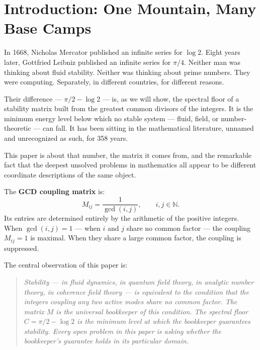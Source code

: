 \documentclass[12pt]{article}
\begin{document}
\newpage
\tableofcontents
\newpage

\section{Introduction: One Mountain, Many Base Camps}

In 1668, Nicholas Mercator published an infinite series for
$\log 2$. Eight years later, Gottfried Leibniz published an
infinite series for $\pi/4$. Neither man was thinking about
fluid stability. Neither was thinking about prime numbers.
They were computing. Separately, in different countries, for
different reasons.

Their difference --- $\pi/2 - \log 2$ --- is, as we will show,
the spectral floor of a stability matrix built from the greatest
common divisors of the integers. It is the minimum energy level
below which no stable system --- fluid, field, or number-theoretic
--- can fall. It has been sitting in the mathematical literature,
unnamed and unrecognized as such, for 358 years.

This paper is about that number, the matrix it comes from, and
the remarkable fact that the deepest unsolved problems in
mathematics all appear to be different coordinate descriptions
of the same object.

The \textbf{GCD coupling matrix} is:
\begin{equation}
M_{ij} = \frac{1}{\gcd(i,j)}, \qquad i,j \in \mathbb{N}.
\label{eq:M}
\end{equation}
Its entries are determined entirely by the arithmetic of the
positive integers. When $\gcd(i,j) = 1$ --- when $i$ and $j$
share no common factor --- the coupling $M_{ij} = 1$ is maximal.
When they share a large common factor, the coupling is suppressed.

The central observation of this paper is:

\begin{quote}
\textit{Stability --- in fluid dynamics, in quantum field theory,
in analytic number theory, in coherence field theory --- is
equivalent to the condition that the integers coupling any
two active modes share no common factor. The matrix $M$ is
the universal bookkeeper of this condition. The spectral floor
$C = \pi/2 - \log 2$ is the minimum level at which the bookkeeper
guarantees stability. Every open problem in this paper is asking
whether the bookkeeper's guarantee holds in its particular domain.}
\end{quote}
\end{document}
